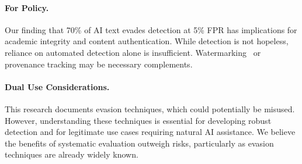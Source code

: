 \paragraph{For Policy.} Our finding that 70\% of AI text evades detection at 5\% FPR has implications for academic integrity and content authentication. While detection is not hopeless, reliance on automated detection alone is insufficient. Watermarking~\citep{kirchenbauer2023watermark} or provenance tracking may be necessary complements.

\paragraph{Dual Use Considerations.} This research documents evasion techniques, which could potentially be misused. However, understanding these techniques is essential for developing robust detection and for legitimate use cases requiring natural AI assistance. We believe the benefits of systematic evaluation outweigh risks, particularly as evasion techniques are already widely known.
